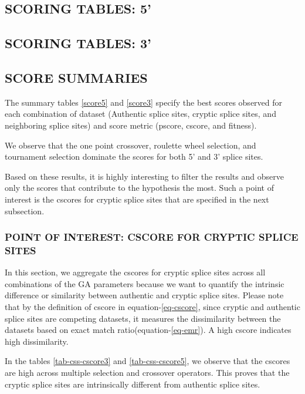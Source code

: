 \documentclass[12pt,a4paper]{article}
\begin{document}
	\subsection{SCORING TABLES: 5'}
	
	\subsection{SCORING TABLES: 3'}
	

	\subsection{SCORE SUMMARIES} 
	
	
	
	The summary tables \ref{score5} and \ref{score3} specify the best scores observed for each combination of dataset (Authentic splice sites, cryptic splice sites, and neighboring splice sites) and score metric (pscore, cscore, and fitness). \par
	We observe that the one point crossover, roulette wheel selection, and tournament selection dominate the scores for both 5' and 3' splice sites. \par
	Based on these results, it is highly interesting to filter the results and observe only the scores that contribute to the hypothesis the most. Such a point of interest is the cscores for cryptic splice sites that are specified in the next subsection.
	
	\subsubsection{POINT OF INTEREST: CSCORE FOR CRYPTIC SPLICE SITES}
	
	In this section, we aggregate the cscores for cryptic splice sites across all combinations of the GA parameters because we want to quantify the intrinsic difference or similarity between authentic and cryptic splice sites. Please note that by the definition of cscore in equation-\ref{eq-cscore}, since cryptic and authentic splice sites are competing datasets, it measures the dissimilarity between the datasets based on exact match ratio(equation-\ref{eq-emr}). A high cscore indicates high dissimilarity.
	
	
	
	In the tables \ref{tab-css-cscore3} and \ref{tab-css-cscore5}, we observe that the cscores are high across multiple selection and crossover operators. This proves that the cryptic splice sites are intrinsically different from authentic splice sites.
	
\end{document}
